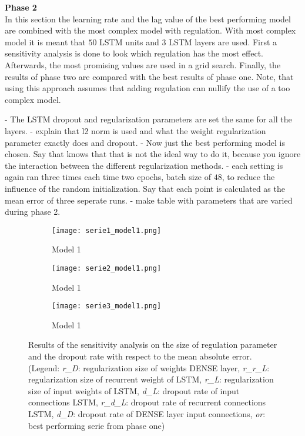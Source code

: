\textbf{Phase 2}\\
In this section the learning rate and the lag value of the best performing model are combined with the most complex model with regulation. With most complex model it is meant that $ 50 $ LSTM units and $ 3 $ LSTM layers are used. First a sensitivity analysis is done to look which regulation has the most effect. Afterwards, the most promising values are used in a grid search. Finally, the results of phase two are compared with the best results of phase one. Note, that using this approach assumes that adding regulation can nullify the use of a too complex model. 

- The LSTM dropout and regularization parameters are set the same for all the layers.
- explain that l2 norm is used and what the weight regularization parameter exactly does and dropout. 
- Now just the best performing model is chosen. Say that knows that that is not the ideal way to do it, because you ignore the interaction between the different regularization methods. 
- each setting is again ran three times each time two epochs, batch size of $ 48 $, to reduce the influence of the random initialization. Say that each point is calculated as the mean error of three seperate runs.
- make table with parameters that are varied during phase 2.

\begin{figure}[ht]
	\centering
	\begin{subfigure}{0.49\linewidth}
		\texttt{[image: serie1\_model1.png]}
		\caption{Model 1}
	\end{subfigure}	
	\begin{subfigure}{0.49\linewidth}
		\texttt{[image: serie2\_model1.png]}
		\caption{Model 1}
	\end{subfigure}
\begin{subfigure}{0.5\linewidth}
	\texttt{[image: serie3\_model1.png]}
	\caption{Model 1}
\end{subfigure}
	\caption{Results of the sensitivity analysis on the size of regulation parameter and the dropout rate with respect to the mean absolute error.(Legend: \textit{r\_D}: regularization size of weights DENSE layer,  \textit{r\_r\_L}: regularization size of recurrent weight of LSTM, \textit{r\_L}: regularization size of input weights of LSTM, \textit{d\_L}: dropout rate of input connections LSTM, \textit{r\_d\_L}: dropout rate of recurrent connections LSTM, \textit{d\_D}: dropout rate of DENSE layer input connections, \textit{or}: best performing serie from phase one)}
	\label{fig:sensitivity_model1}
\end{figure}

